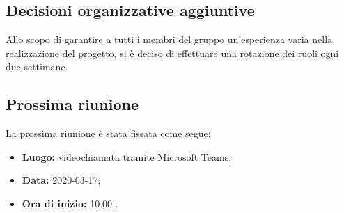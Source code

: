 \subsection{Decisioni organizzative aggiuntive}
Allo scopo di garantire a tutti i membri del gruppo un'esperienza varia nella realizzazione del progetto, si è deciso di effettuare una rotazione dei ruoli ogni due settimane.
 

\subsection{Prossima riunione}
La prossima riunione è stata fissata come segue: 
\begin{itemize}
	\item \textbf{Luogo: } videochiamata tramite Microsoft Teams; 
	\item \textbf{Data: } 2020-03-17; 
	\item \textbf{Ora di inizio: } 10.00 .
\end{itemize}